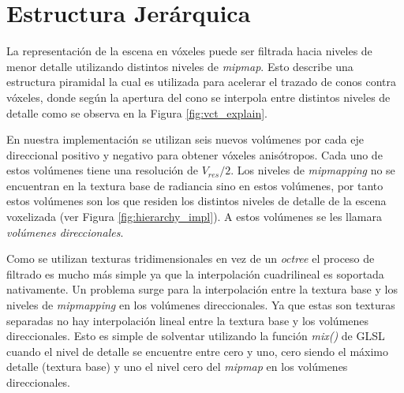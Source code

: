 \section{Estructura Jerárquica} %
\label{sec:estructura_jerarquica_impl}
La representación de la escena en vóxeles puede ser filtrada hacia niveles de menor detalle utilizando distintos niveles de \emph{mipmap}. Esto describe una estructura piramidal la cual es utilizada para acelerar el trazado de conos contra vóxeles, donde según la apertura del cono se interpola entre distintos niveles de detalle como se observa en la Figura \ref{fig:vct_explain}.

En nuestra implementación se utilizan seis nuevos volúmenes por cada eje direccional positivo y negativo para obtener vóxeles anisótropos. Cada uno de estos volúmenes tiene una resolución de $V_{res}/{2}$. Los niveles de \emph{mipmapping} no se encuentran en la textura base de radiancia sino en estos volúmenes, por tanto estos volúmenes son los que residen los distintos niveles de detalle de la escena voxelizada (ver Figura \ref{fig:hierarchy_impl}). A estos volúmenes se les llamara \emph{volúmenes direccionales}.

Como se utilizan texturas tridimensionales en vez de un \emph{octree} el proceso de filtrado es mucho más simple ya que la interpolación cuadrilineal es soportada nativamente. Un problema surge para la interpolación entre la textura base y los niveles de \emph{mipmapping} en los volúmenes direccionales. Ya que estas son texturas separadas no hay interpolación lineal entre la textura base y los volúmenes direccionales. Esto es simple de solventar utilizando la función \emph{mix()} de GLSL cuando el nivel de detalle se encuentre entre cero y uno, cero siendo el máximo detalle (textura base) y uno el nivel cero del \emph{mipmap} en los volúmenes direccionales.

